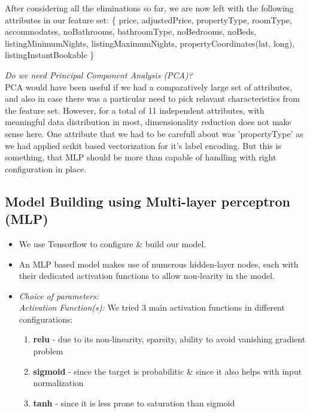 \documentclass[conference]{IEEEtran}
\begin{document}
{	After considering all the eliminations so far, we are now left with the following attributes in our feature set:
	\{ price, adjustedPrice, propertyType, roomType, accommodates, noBathrooms, bathroomType, noBedrooms, noBeds, listingMinimumNights, listingMaximumNights, propertyCoordinates(lat, long), listingInstantBookable \}

	\textit{Do we need Principal Component Analysis (PCA)?}\\
            PCA would have been useful if we had a comparatively large set of attributes, and also in case there was a particular need to pick relavant characteristics from the feature set.
            However, for a total of 11 independent attributes, with meaningful data distribution in most, dimensionality reduction does not make sense here. One attribute that we had to be carefull about was 'propertyType' as we had applied scikit based vectorization for it’s label encoding. But this is something, that MLP should be more than capable of handling with right configuration in place.


	\subsection{\textbf{Model Building using Multi-layer perceptron (MLP)}}
		\begin{itemize}
			\item We use Tensorflow \cite{6_MLP} to configure \& build our model.
			\item An MLP based model makes use of numerous hidden-layer nodes, each with their dedicated activation functions to allow non-learity in the model.
			\item\textit{ Choice of parameters:}\\
				\textit{Activation Function(s):} We tried 3 main activation functions in different configurations:
				\begin{enumerate}
					\item \textbf{relu} - due to its non-linearity, sparsity, ability to avoid vanishing gradient problem
					\item \textbf{sigmoid} - since the target is probabilitic \& since it also helps with input normalization
					\item \textbf{tanh} - since it is less prone to saturation than sigmoid\\
				\end{enumerate}

                \vspace{-2mm}


\end{itemize}}
\end{document}
